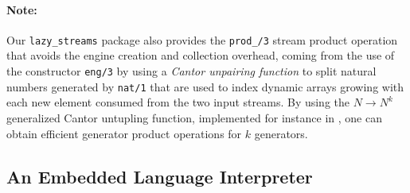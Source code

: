 \documentclass{new_tlp}
\begin{document}
\paragraph{Note:} Our {\tt lazy\_streams} package also provides the {\tt prod\_/3} stream product 
operation that avoids the engine creation and collection overhead,
coming from the use of the constructor {\tt eng/3} by using a \emph{Cantor
unpairing function} to split natural numbers generated by {\tt nat/1}
that are used to index dynamic arrays growing with each new element consumed
from the two input streams. By using the  $N \rightarrow N^k$ generalized Cantor
untupling function, implemented for instance in \cite{serpro}, one can obtain efficient
generator product operations for $k$ generators.


\subsection{An Embedded Language Interpreter}
\end{document}
